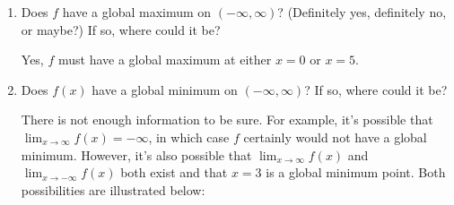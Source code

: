 \documentclass{article}
\begin{document}
\begin{enumerate}
  \begin{enumerate}
  \item


    \begin{problem}[\vfill]
      Does $f$ have a global maximum on $(-\infty, \infty)$? (Definitely yes, definitely no, or maybe?) If so, where could it be?
    \end{problem}

    \begin{solution}
      Yes, $f$ must have a global maximum at either $x = 0$ or $x = 5$.
    \end{solution}

  \item

    \begin{problem}[\vfill]
      Does $f(x)$ have a global minimum on $(-\infty, \infty)$? If so, where could it be?
    \end{problem}

    \begin{solution}
      There is not enough information to be sure. For example, it's possible that $\displaystyle \lim_{x \to \infty} f(x) = - \infty$, in which case $f$ certainly would not have a global minimum. However, it's also possible that $\displaystyle \lim_{x \to \infty} f(x)$ and $\displaystyle \lim_{x \to -\infty} f(x)$ both exist and that $x = 3$ is a global minimum point. Both possibilities are illustrated below:
      \begin{center}
        \hspace{0.5in}
      \end{center}
    \end{solution}


\end{enumerate}
\end{enumerate}
\end{document}
